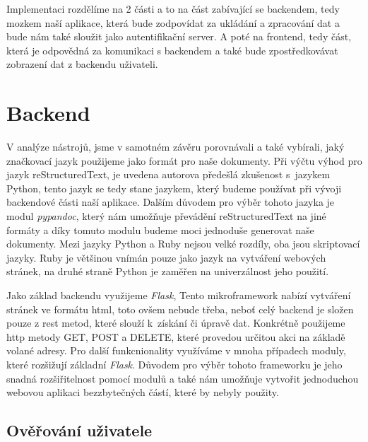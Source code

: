 Implementaci rozdělíme na 2 části a to na část zabívající se backendem, tedy mozkem naší aplikace, která bude zodpovídat
za ukládání a zpracování dat a bude nám také sloužit jako autentifikační server. A poté na frontend, tedy část, která
je odpovědná za komunikaci s backendem a také bude zpostředkovávat zobrazení dat z backendu uživateli.

\section{Backend}

V analýze nástrojů, jsme v samotném závěru porovnávali a také vybírali, jaký značkovací jazyk použijeme jako formát pro naše dokumenty.
Při výčtu výhod pro jazyk reStructuredText, je uvedena autorova předešlá zkušenost s~jazykem Python, tento jazyk se tedy stane jazykem,
který budeme používat při vývoji backendové části naší aplikace.
Dalším důvodem pro výběr tohoto jazyka je modul \textit{pypandoc},
který nám umožňuje převádění reStructuredText na jiné formáty a díky tomuto modulu budeme moci jednoduše generovat naše dokumenty. Mezi jazyky
Python a Ruby nejsou velké rozdíly, oba jsou skriptovací jazyky. Ruby je většinou vnímán pouze jako jazyk na vytváření webových stránek, na druhé straně
Python je zaměřen na univerzálnost jeho použití. \cite{pythonRubyFight}

Jako základ backendu využijeme \textit{Flask},  \cite{flaskDoc}
Tento mikroframework nabízí vytváření stránek ve formátu \gls{html}, toto ovšem \mbox{nebude} třeba, \mbox{neboť} celý backend je složen pouze z \gls{rest} metod,
které slouží k~získání či úpravě dat. Konkrétně použijeme \gls{http} metody GET, POST a DELETE, které provedou určitou akci na základě volané adresy.
Pro další funkcnionality využíváme v mnoha případech moduly, které rozšižují základní \textit{Flask}. Důvodem pro výběr tohoto frameworku
je jeho snadná rozšiřitelnost pomocí modulů a také nám umožňuje vytvořit jednoduchou webovou aplikaci bez\linebreak zbytečných částí, které by nebyly použity.

\subsection{Ověřování uživatele}

